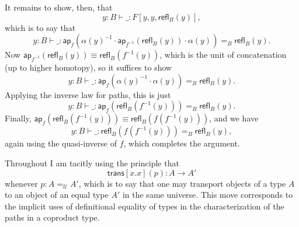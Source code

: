\documentclass{article}
\newcommand{\idty}[3]{{#2}\mathbin{=_{#1}}{#3}}
\newcommand{\refl}[2]{\mathsf{refl}_{#1}({#2})}
\newcommand{\family}[2]{{#1}.{#2}}
\newcommand{\app}[2]{{#1}({#2})}
\newcommand{\apppath}[1]{\mathsf{ap}_{#1}}
\newcommand{\univty}{\mathcal{U}}
\newcommand{\inverse}[1]{#1^{-1}}
\newcommand{\concat}[2]{{#1}\cdot{#2}}
\newcommand{\transport}[2]{\mathsf{trans}[#1](#2)}
\begin{document}
It remains to show, then, that 
\begin{displaymath}
  y:B \vdash \_ : F[y,y,\refl{B}{y}],
\end{displaymath}
which is to say that 
\begin{displaymath}
  y:B \vdash \_ : \idty{B}{\app{\apppath{f}}{\concat{\concat{\inverse{\app{\alpha}{y}}}{\app{\apppath{\inverse{f}}}{\refl{B}{y}}}}{\app{\alpha}{y}}}}{\refl{B}{y}}.
\end{displaymath}
Now $\app{\apppath{\inverse{f}}}{\refl{B}{y}}\equiv \refl{B}{\app{\inverse{f}}{y}}$, which is the unit of concatenation (up to higher homotopy), so it suffices to show
\begin{displaymath}
  y:B \vdash \_ : \idty{B}{\app{\apppath{f}}{\concat{\inverse{\app{\alpha}{y}}}{\app{\alpha}{y}}}}{\refl{B}{y}}.
\end{displaymath}
Applying the inverse law for paths, this is just
\begin{displaymath}
  y:B \vdash \_ : \idty{B}{\app{\apppath{f}}{\refl{B}{\app{\inverse{f}}{y}}}}{\refl{B}{y}}.
\end{displaymath}
Finally, $\app{\apppath{f}}{\refl{B}{\app{\inverse{f}}{y}}}\equiv \refl{B}{\app{f}{\app{\inverse{f}}{y}}}$, and we have
\begin{displaymath}
  y:B \vdash \_ : \idty{B}{\refl{B}{\app{f}{\app{\inverse{f}}{y}}}}{\refl{B}{y}},
\end{displaymath}
again using the quasi-inverse of $f$, which completes the argument.

\smallskip

Throughout I am tacitly using the principle that $$\transport{\family{x}{x}}{p}:A\to A'$$ whenever $p:\idty{\univty}{A}{A'}$, which is to say that one may transport objects of a type $A$ to an object of an equal type $A'$ in the same universe.  This move corresponds to the implicit uses of definitional equality of types in the characterization of the paths in a coproduct type.
\end{document}
